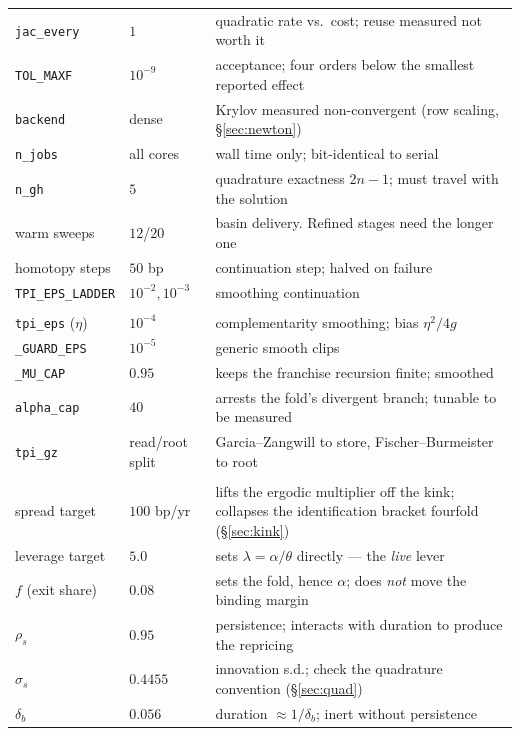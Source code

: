 \documentclass[10pt,a4paper]{article}
\theoremstyle{definition}
\theoremstyle{plain}
\theoremstyle{remark}
\newcommand{\code}[1]{\texttt{#1}}
\begin{document}
\begin{center}
\begin{longtable}{@{}p{}p{}p{}@{}}
\code{jac\_every} & $1$ & quadratic rate vs.\ cost; reuse measured not worth it \\
\code{TOL\_MAXF} & $10^{-9}$ & acceptance; four orders below the smallest reported effect \\
\code{backend} & dense & Krylov measured non-convergent (row scaling, \S\ref{sec:newton}) \\
\code{n\_jobs} & all cores & wall time only; bit-identical to serial \\
\code{n\_gh} & $5$ & quadrature exactness $2n{-}1$; must travel with the solution \\
warm sweeps & $12$/$20$ & basin delivery. Refined stages need the longer one \\
homotopy steps & $50$ bp & continuation step; halved on failure \\
\code{TPI\_EPS\_LADDER} & $10^{-2},10^{-3}$ & smoothing continuation \\
\addlinespace
\multicolumn{3}{@{}l}{\textbf{\emph{Nonsmoothness}}}\\
\code{tpi\_eps} ($\eta$) & $10^{-4}$ & complementarity smoothing; bias $\eta^2/4g$ \\
\code{\_GUARD\_EPS} & $10^{-5}$ & generic smooth clips \\
\code{\_MU\_CAP} & $0.95$ & keeps the franchise recursion finite; smoothed \\
\code{alpha\_cap} & $40$ & arrests the fold's divergent branch; tunable to be measured \\
\code{tpi\_gz} & read/root split & Garcia--Zangwill to store, Fischer--Burmeister to root \\
\addlinespace
\multicolumn{3}{@{}l}{\textbf{\emph{Economics that is also numerics}}}\\
spread target & $100$ bp/yr & lifts the ergodic multiplier off the kink; collapses the
identification bracket fourfold (\S\ref{sec:kink}) \\
leverage target & $5.0$ & sets $\lambda = \alpha/\theta$ directly --- the \emph{live} lever \\
$f$ (exit share) & $0.08$ & sets the fold, hence $\alpha$; does \emph{not} move the binding
margin \\
$\rho_s$ & $0.95$ & persistence; interacts with duration to produce the repricing \\
$\sigma_s$ & $0.4455$ & innovation s.d.; check the quadrature convention
(\S\ref{sec:quad}) \\
$\delta_b$ & $0.056$ & duration $\approx 1/\delta_b$; inert without persistence \\

\end{longtable}
\end{center}
\end{document}
